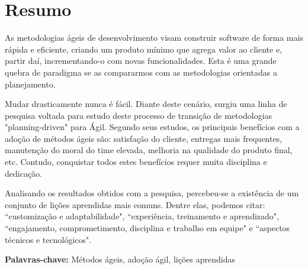 \chapter*{Resumo}

As metodologias ágeis de desenvolvimento visam construir software de forma mais rápida e eficiente, criando um produto mínimo que agrega valor ao cliente e, partir daí, incrementando-o com novas funcionalidades. Esta é uma grande quebra de paradigma se as compararmos com as metodologias orientadas a planejamento.

Mudar drasticamente nunca é fácil. Diante deste cenário, surgiu uma linha de pesquisa voltada para estudo deste processo de transição de metodologias "planning-driven" para Ágil. Segundo seus estudos, os principais benefícios com a adoção de métodos ágeis são: satisfação do cliente, entregas mais frequentes, manutenção do moral do time elevada, melhoria na qualidade do produto final, etc. Contudo, conquistar todos estes benefícios requer muita disciplina e dedicação.

Analisando os resultados obtidos com a pesquisa, percebeu-se a existência de um conjunto de lições aprendidas mais comuns. Dentre elas, podemos citar: ``customização e adaptabilidade", ``experiência, treinamento e aprendizado", ``engajamento, comprometimento, disciplina e trabalho em equipe" e ``aspectos técnicos e tecnológicos".

\textbf{Palavras-chave:} Métodos ágeis, adoção ágil, lições aprendidas
